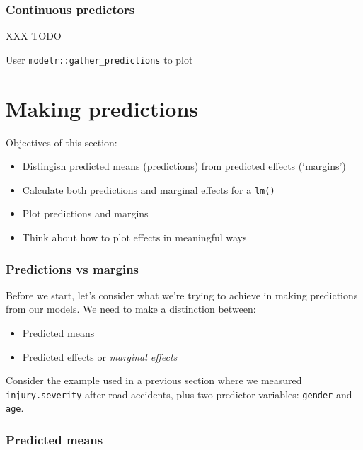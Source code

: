 \documentclass[]{article}
\providecommand{\tightlist}{%
  \setlength{\itemsep}{0pt}\setlength{\parskip}{0pt}}
\theoremstyle{definition}
\theoremstyle{definition}
\theoremstyle{definition}
\theoremstyle{remark}
\begin{document}
\subsubsection*{Continuous predictors}\label{continuous-predictors}

XXX TODO

User \texttt{modelr::gather\_predictions} to plot

\hypertarget{predictions-and-margins}{\section{Making
predictions}\label{predictions-and-margins}}

Objectives of this section:

\begin{itemize}
\tightlist
\item
  Distingish predicted means (predictions) from predicted effects
  (`margins')
\item
  Calculate both predictions and marginal effects for a \texttt{lm()}
\item
  Plot predictions and margins
\item
  Think about how to plot effects in meaningful ways
\end{itemize}

\subsubsection*{Predictions vs margins}\label{predictions-vs-margins}

Before we start, let's consider what we're trying to achieve in making
predictions from our models. We need to make a distinction between:

\begin{itemize}
\tightlist
\item
  Predicted means
\item
  Predicted effects or \emph{marginal effects}
\end{itemize}

Consider the example used in a previous section where we measured
\texttt{injury.severity} after road accidents, plus two predictor
variables: \texttt{gender} and \texttt{age}.

\subsubsection*{Predicted means}\label{predicted-means}
\end{document}
